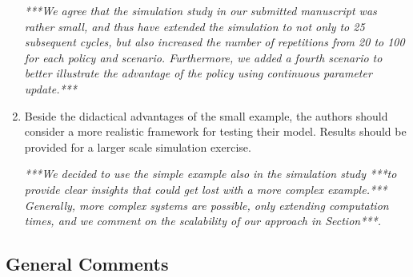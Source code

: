 \documentclass[authoryear]{elsarticle}
\begin{document}
\begin{enumerate}
\smallskip

\emph{***We agree that the simulation study in our submitted manuscript was rather small,
and thus have extended the simulation to not only to 25 subsequent cycles,
but also increased the number of repetitions from 20 to 100 for each policy and scenario.
Furthermore, we added a fourth scenario to better illustrate the advantage of the policy
using continuous parameter update.***}

\item Beside the didactical advantages of the small example, the authors should consider a more realistic framework for testing their model. Results should be provided for a larger scale simulation exercise.

\smallskip

\emph{***We decided to use the simple example also in the simulation study ***to provide clear insights
that could get lost with a more complex example.***
Generally, more complex systems are possible, only extending computation times,
and we comment on the scalability of our approach in Section***.}
\end{enumerate}


\subsection*{General Comments}
\end{document}
